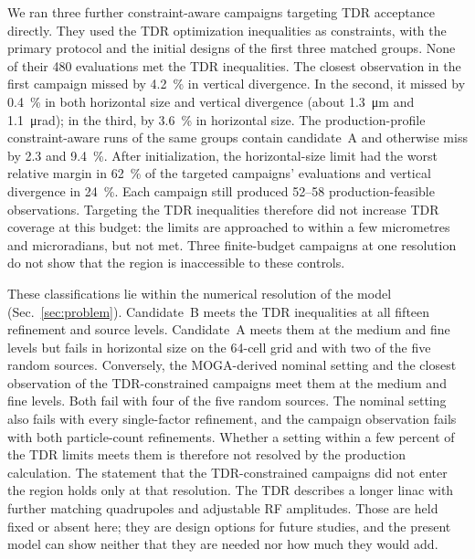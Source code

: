 \documentclass[aps,prab,reprint,superscriptaddress,amsmath,amssymb,floatfix]{revtex4-2}
\begin{document}
We ran three further constraint-aware campaigns targeting TDR acceptance directly. They used the
TDR optimization inequalities as constraints, with the primary protocol and the initial designs
of the first three matched groups. None of their 480 evaluations met the TDR inequalities. The
closest observation in the first campaign missed by \SI{4.2}{\percent} in vertical divergence.
In the second, it missed by \SI{0.4}{\percent} in both horizontal size and vertical divergence
(about \SI{1.3}{\micro\metre} and \SI{1.1}{\micro\radian}); in the third, by \SI{3.6}{\percent}
in horizontal size. The production-profile constraint-aware runs of the same groups contain
candidate~A and otherwise miss by 2.3 and \SI{9.4}{\percent}. After initialization, the
horizontal-size limit had the worst relative margin in \SI{62}{\percent} of the targeted
campaigns' evaluations and vertical divergence in \SI{24}{\percent}. Each campaign still
produced 52--58 production-feasible observations. Targeting the TDR inequalities therefore did
not increase TDR coverage at this budget: the limits are approached to within a few micrometres
and microradians, but not met. Three finite-budget campaigns at one resolution do not show that
the region is inaccessible to these controls.

These classifications lie within the numerical resolution of the model (Sec.~\ref{sec:problem}).
Candidate~B meets the TDR inequalities at all fifteen refinement and source levels. Candidate~A
meets them at the medium and fine levels but fails in horizontal size on the 64-cell grid and
with two of the five random sources. Conversely, the MOGA-derived nominal setting and the
closest observation of the TDR-constrained campaigns meet them at the medium and fine levels.
Both fail with four of the five random sources. The nominal setting also fails with every
single-factor refinement, and the campaign observation fails with both particle-count
refinements. Whether a setting within a few percent of the TDR limits meets them is therefore
not resolved by the production calculation. The statement that the TDR-constrained campaigns did
not enter the region holds only at that resolution. The TDR describes a longer linac with
further matching quadrupoles and adjustable RF amplitudes. Those are held fixed or absent here;
they are design options for future studies, and the present model can show neither that they are
needed nor how much they would add.
\end{document}
